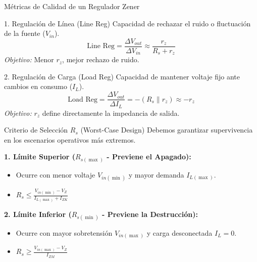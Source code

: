 \documentclass[10pt, aspectratio=169]{beamer}
\begin{document}
\begin{frame}{Métricas de Calidad de un Regulador Zener}
  \begin{block}{1. Regulación de Línea (Line Reg)}
      Capacidad de rechazar el ruido o fluctuación de la fuente ($V_{in}$).
      \begin{equation*}
          \text{Line Reg} = \frac{\Delta V_{out}}{\Delta V_{in}} \approx \frac{r_z}{R_s + r_z}
      \end{equation*}
      \textit{Objetivo:} Menor $r_z$, mejor rechazo de ruido.
  \end{block}
  
  \vspace{0.3cm}
  \begin{block}{2. Regulación de Carga (Load Reg)}
      Capacidad de mantener voltaje fijo ante cambios en consumo ($I_L$).
      \begin{equation*}
          \text{Load Reg} = \frac{\Delta V_{out}}{\Delta I_L} = -(R_s \parallel r_z) \approx -r_z
      \end{equation*}
      \textit{Objetivo:} $r_z$ define directamente la impedancia de salida.
  \end{block}
\end{frame}

\begin{frame}{Criterio de Selección $R_s$ (Worst-Case Design)}
  Debemos garantizar supervivencia en los escenarios operativos más extremos.
  
  \vspace{0.3cm}
  \textbf{1. Límite Superior ($R_{s(\max)}$ - Previene el Apagado):}
  \begin{itemize}
      \item Ocurre con menor voltaje $V_{in(\min)}$ y mayor demanda $I_{L(\max)}$.
      \item $R_s \le \frac{V_{in(\min)} - V_Z}{I_{L(\max)} + I_{ZK}}$
  \end{itemize}
  
  \vspace{0.3cm}
  \textbf{2. Límite Inferior ($R_{s(\min)}$ - Previene la Destrucción):}
  \begin{itemize}
      \item Ocurre con mayor sobretensión $V_{in(\max)}$ y carga desconectada $I_{L} = 0$.
      \item $R_s \ge \frac{V_{in(\max)} - V_Z}{I_{ZM}}$
  \end{itemize}
\end{frame}
\end{document}
